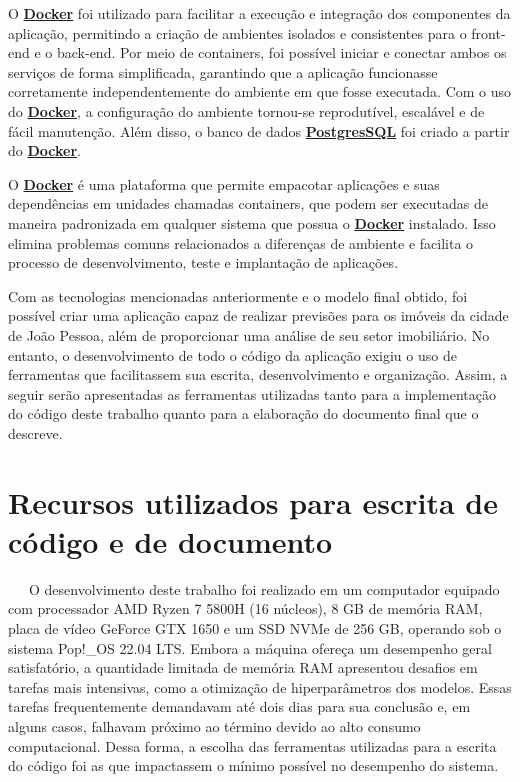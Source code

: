 \documentclass[
  12pt,
  a4paper,
]{scrreprt}
\begin{document}
\vspace{12pt}

O \href{https://www.docker.com/}{\textbf{Docker}} foi utilizado para
facilitar a execução e integração dos componentes da aplicação,
permitindo a criação de ambientes isolados e consistentes para o
front-end e o back-end. Por meio de containers, foi possível iniciar e
conectar ambos os serviços de forma simplificada, garantindo que a
aplicação funcionasse corretamente independentemente do ambiente em que
fosse executada. Com o uso do
\href{https://www.docker.com/}{\textbf{Docker}}, a configuração do
ambiente tornou-se reprodutível, escalável e de fácil manutenção. Além
disso, o banco de dados
\href{https://www.postgresql.org/}{\textbf{PostgresSQL}} foi criado a
partir do \href{https://www.docker.com/}{\textbf{Docker}}.

\vspace{12pt}

O \href{https://www.docker.com/}{\textbf{Docker}} é uma plataforma que
permite empacotar aplicações e suas dependências em unidades chamadas
containers, que podem ser executadas de maneira padronizada em qualquer
sistema que possua o \href{https://www.docker.com/}{\textbf{Docker}}
instalado. Isso elimina problemas comuns relacionados a diferenças de
ambiente e facilita o processo de desenvolvimento, teste e implantação
de aplicações.

\vspace{12pt}

Com as tecnologias mencionadas anteriormente e o modelo final obtido,
foi possível criar uma aplicação capaz de realizar previsões para os
imóveis da cidade de João Pessoa, além de proporcionar uma análise de
seu setor imobiliário. No entanto, o desenvolvimento de todo o código da
aplicação exigiu o uso de ferramentas que facilitassem sua escrita,
desenvolvimento e organização. Assim, a seguir serão apresentadas as
ferramentas utilizadas tanto para a implementação do código deste
trabalho quanto para a elaboração do documento final que o descreve.

\section{Recursos utilizados para escrita de código e de
documento}\label{recursos-utilizados-para-escrita-de-cuxf3digo-e-de-documento}

~~~O desenvolvimento deste trabalho foi realizado em um computador
equipado com processador AMD Ryzen 7 5800H (16 núcleos), 8 GB de memória
RAM, placa de vídeo GeForce GTX 1650 e um SSD NVMe de 256 GB, operando
sob o sistema Pop!\_OS 22.04 LTS. Embora a máquina ofereça um desempenho
geral satisfatório, a quantidade limitada de memória RAM apresentou
desafios em tarefas mais intensivas, como a otimização de
hiperparâmetros dos modelos. Essas tarefas frequentemente demandavam até
dois dias para sua conclusão e, em alguns casos, falhavam próximo ao
término devido ao alto consumo computacional. Dessa forma, a escolha das
ferramentas utilizadas para a escrita do código foi as que impactassem o
mínimo possível no desempenho do sistema.
\end{document}
